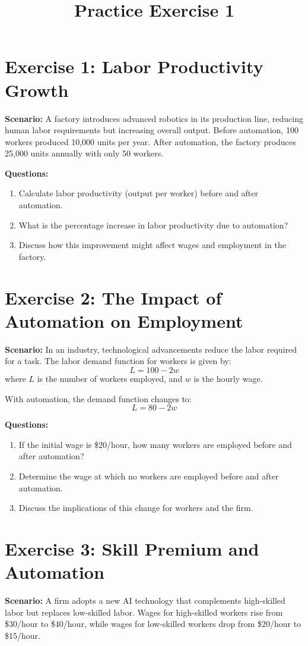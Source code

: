\documentclass[12pt]{article}
\title{Practice Exercise 1}
\author{}
\date{}
\begin{document}
\maketitle

\section*{Exercise 1: Labor Productivity Growth}
\textbf{Scenario:} A factory introduces advanced robotics in its production line, reducing human labor requirements but increasing overall output. Before automation, 100 workers produced 10,000 units per year. After automation, the factory produces 25,000 units annually with only 50 workers.

\textbf{Questions:}
\begin{enumerate}
    \item Calculate labor productivity (output per worker) before and after automation.
    \item What is the percentage increase in labor productivity due to automation?
    \item Discuss how this improvement might affect wages and employment in the factory.
\end{enumerate}

\section*{Exercise 2: The Impact of Automation on Employment}
\textbf{Scenario:} In an industry, technological advancements reduce the labor required for a task. The labor demand function for workers is given by:
\[ L = 100 - 2w \]
where $L$ is the number of workers employed, and $w$ is the hourly wage.

With automation, the demand function changes to:
\[ L = 80 - 2w \]

\textbf{Questions:}
\begin{enumerate}
    \item If the initial wage is \$20/hour, how many workers are employed before and after automation?
    \item Determine the wage at which no workers are employed before and after automation.
    \item Discuss the implications of this change for workers and the firm.
\end{enumerate}

\section*{Exercise 3: Skill Premium and Automation}
\textbf{Scenario:} A firm adopts a new AI technology that complements high-skilled labor but replaces low-skilled labor. Wages for high-skilled workers rise from \$30/hour to \$40/hour, while wages for low-skilled workers drop from \$20/hour to \$15/hour.
\end{document}
